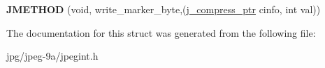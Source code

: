 \begin{DoxyCompactItemize}
\item 
\hypertarget{structjpeg__marker__writer_a193395c80dab66a95681aff53cd5c468}{{\bfseries J\+M\+E\+T\+H\+O\+D} (void, write\+\_\+marker\+\_\+byte,(\hyperlink{structjpeg__compress__struct}{j\+\_\+compress\+\_\+ptr} cinfo, int val))}\label{structjpeg__marker__writer_a193395c80dab66a95681aff53cd5c468}

\end{DoxyCompactItemize}


The documentation for this struct was generated from the following file\+:\begin{DoxyCompactItemize}
\item 
jpg/jpeg-\/9a/jpegint.\+h\end{DoxyCompactItemize}
